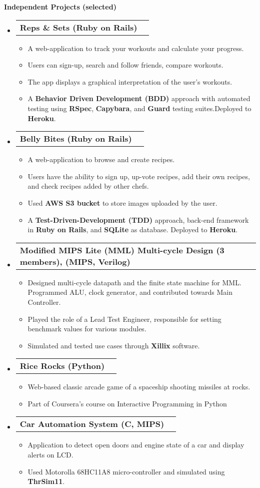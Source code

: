 \documentclass[letterpaper,10pt]{article}
\makeatletter
\newcommand{\resitem}[1]{\item #1 \vspace{-2pt}}
\newcommand{\resheading}[1]{{\large \colorbox{mygrey}{\begin{minipage}{\textwidth}{\textbf{#1 \vphantom{p\^{E}}}}\end{minipage}}}}
\newcommand{\ressubheading}[4]{
\begin{tabular*}{7.0in}{l@{\extracolsep{\fill}}r}
		\textbf{#1} & \textit{#4} \\
\end{tabular*}\vspace{-6pt}}
\makeatother
\begin{document}
\resheading{Independent Projects (selected)}
\begin{itemize}
\item
	\ressubheading{Reps \& Sets (Ruby on Rails)}{}{}{}
	\begin{itemize}
		\resitem{A web-application to track your workouts and calculate your progress.}
        \resitem{Users can sign-up, search and follow friends, compare workouts.} 
        \resitem{The app displays a graphical interpretation of the user's workouts.} 
        \resitem{A \textbf{Behavior Driven Development (BDD)} approach with automated testing using \textbf{RSpec}, \textbf{Capybara}, and \textbf{Guard} testing suites.Deployed to \textbf{Heroku}.}
	\end{itemize}
    
    \item
	\ressubheading{Belly Bites (Ruby on Rails)}{}{}{}
	\begin{itemize}
		\resitem{A web-application to browse and create recipes.}
        \resitem{Users have the ability to sign up, up-vote recipes, add their own recipes, and check recipes added by other chefs.} 
        \resitem{Used \textbf{AWS S3 bucket} to store images uploaded by the user.}
        \resitem{A \textbf{Test-Driven-Development (TDD)} approach, back-end framework in \textbf{Ruby on Rails}, and \textbf{SQLite} as database. Deployed to \textbf{Heroku}.}
        
	\end{itemize}
    
        \item
	\ressubheading{Modified MIPS Lite (MML) Multi-cycle Design (3 members), (MIPS, Verilog)}{}{}{}
	\begin{itemize}
		\resitem{Designed multi-cycle datapath and the finite state machine for MML. Programmed ALU, clock generator, and contributed towards Main Controller.}
        \resitem{Played the role of a Lead Test Engineer, responsible for setting benchmark values for various modules.}
        \resitem{Simulated and tested use cases through \textbf{Xillix} software.}        
	\end{itemize}
    
     \item
	\ressubheading{Rice Rocks (Python)}{}{}{}
	\begin{itemize}
		\resitem{Web-based classic arcade game of a spaceship shooting missiles at rocks.}
        \resitem{Part of Coursera's course on Interactive Programming in Python}
	\end{itemize}
 
	\item
	\ressubheading{Car Automation System (C, MIPS)}{}{}{}
	\begin{itemize}
		\resitem{Application to detect open doors and engine state of a car and display alerts on LCD.}
        \resitem{Used Motorolla 68HC11A8 micro-controller and simulated using \textbf{ThrSim11}.}         
	\end{itemize}
 

\end{itemize}
\end{document}
